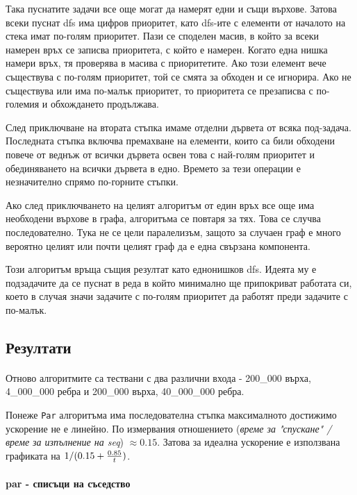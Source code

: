 Така пуснатите задачи все още могат да намерят едни и същи върхове. Затова всеки пуснат dfs има цифров приоритет, като dfs-ите с елементи от началото на стека имат по-голям приоритет. Пази се споделен масив, в който за всеки намерен връх се записва приоритета, с който е намерен. Когато една нишка намери връх, тя проверява в масива с приоритетите. Ако този елемент вече съществува с по-голям приоритет, той се смята за обходен и се игнорира. Ако не съществува или има по-малък приоритет, то приоритета се презаписва с по-големия и обхождането продължава.

След приключване на втората стъпка имаме отделни дървета от всяка под-задача. Последната стъпка включва премахване на елементи, които са били обходени повече от веднъж от всички дървета освен това с най-голям приоритет и обединяването на всички дървета в едно. Времето за тези операции е незначително спрямо по-горните стъпки.

Ако след приключването на целият алгоритъм от един връх все още има необходени върхове в графа, алгоритъма се повтаря за тях. Това се случва последователно. Тука не се цели паралелизъм, защото за случаен граф е много вероятно целият или почти целият граф да е една свързана компонента.

Този алгоритъм връща същия резултат като еднонишков dfs. Идеята му е подзадачите да се пуснат в реда в който минимално ще припокриват работата си, което в случая значи задачите с по-голям приоритет да работят преди задачите с по-малък.

\subsection{Резултати}

\paragraph*{} Отново алгоритмите са тествани с два различни входа - 200\_000 върха, 4\_000\_000 ребра и 200\_000 върха, 40\_000\_000 ребра.

Понеже \verb|Par| алгоритъма има последователна стъпка максималното достижимо ускорение не е линейно. По измервания отношението (\textit{време за "спускане" / време за изпълнение на seq}) $\approx 0.15$. Затова за идеална ускорение е използвана графиката на $1 / (0.15 + {0.85 \over t})$.

\paragraph*{par - списъци на съседство}

